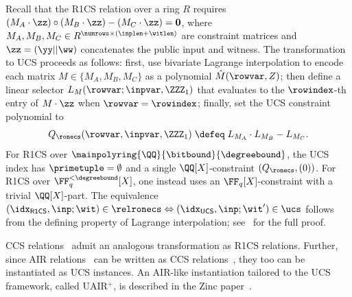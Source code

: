 Recall that the R1CS relation over a ring $R$ requires $(M_A\cdot\zz)\circ(M_B\cdot\zz)-(M_C\cdot\zz)=\mathbf{0}$, where $M_A,M_B,M_C\in R^{\numrows\times(\inplen+\witlen)}$ are constraint matrices and $\zz=(\yy||\ww)$ concatenates the public input and witness.
The transformation to UCS proceeds as follows: first, use bivariate Lagrange interpolation to encode each matrix $M\in\{M_A,M_B,M_C\}$ as a polynomial $\hat M(\rowvar,Z)$; then define a linear selector $L_M(\rowvar;\inpvar,\ZZZ_1)$ that evaluates to the $\rowindex$-th entry of $M\cdot\zz$ when $\rowvar=\rowindex$; finally, set the UCS constraint polynomial to
\[
Q_{\ronecs}(\rowvar,\inpvar,\ZZZ_1)
\;\defeq\;
L_{M_A}\cdot L_{M_B} - L_{M_C}.
\]
For R1CS over $\mainpolyring{\QQ}{\bitbound}{\degreebound}$, the UCS index has $\primetuple=\emptyset$ and a single $\QQ[X]$-constraint $(Q_{\ronecs},(0))$.
For R1CS over $\FF_q^{<\degreebound}[X]$, one instead uses an $\FF_q[X]$-constraint with a trivial $\QQ[X]$-part.
The equivalence $(\idx_{\mathsf{R1CS}},\inp;\wit)\in\relronecs \Leftrightarrow (\idx_{\mathsf{UCS}},\inp;\wit')\in\ucs$ follows from the defining property of Lagrange interpolation; see~\cite[Section~4.4]{Zinc} for the full proof.

CCS relations~\cite{ccs} admit an analogous transformation as R1CS relations. Further, 
since AIR relations~\cite{ethstark} can be written as CCS relations~\cite{ccs}, they too can be instantiated as UCS instances.
An AIR-like instantiation tailored to the UCS framework, called UAIR$^+$, is described in the Zinc paper~\cite{Zinc}.

